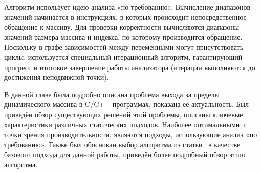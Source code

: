 Алгоритм использует идею анализа «по требованию». Вычисление
диапазонов значений начинается в инструкциях, в которых происходит
непосредственное обращение к массиву. Для проверки корректности
вычисляются диапазоны значений размера массива и индекса, по которому
производится обращение. Поскольку в графе зависимостей между
переменными могут присутствовать циклы, используется специальный
итерационный алгоритм, гарантирующий прогресс и итоговое завершение
работы анализатора (итерации выполняются до достижения неподвижной
точки).

\chapterconclusion

В данной главе была подробно описана проблема выхода за пределы
динамического массива в C/C++ программах, показана её
актуальность. Был приведён обзор существующих решений этой проблемы,
описаны ключевые характеристики различных статических
подходов. Наиболее оптимальными, с точки зрения производительности,
являются подходы, использующие анализ «по требованию». Также был обоснован
выбор алгоритма из статьи~\cite{li2010practical} в качестве базового
подхода для данной работы, приведён более подробный обзор этого
алгоритма.

\FloatBarrier
